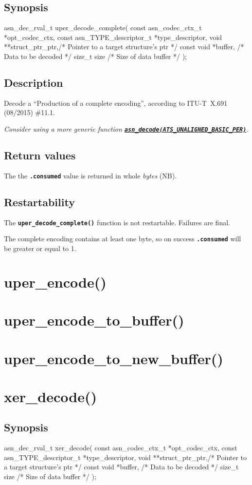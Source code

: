 \documentclass[english,oneside,12pt]{book}
\newcommand{\apisection}[2]{\clearpage\section{\label{#1}#2}}
\newcommand{\api}[2]{\hyperref[#1]{\code{#2}}}
\newcommand{\code}[1]{\texttt{\textbf{\lstinline{#1}}}}
\begin{document}
\subsection*{Synopsis}

\begin{signature}
asn_dec_rval_t uper_decode_complete(
    const asn_codec_ctx_t *opt_codec_ctx,
    const asn_TYPE_descriptor_t *type_descriptor,
    void **struct_ptr_ptr,/* Pointer to a target structure's ptr */
    const void *buffer,   /* Data to be decoded */
    size_t size           /* Size of data buffer */
);
\end{signature}

\subsection*{Description}

Decode a ``Production of a complete encoding'',
according to ITU-T~X.691 (08/2015) \#11.1.\newline

\noindent\emph{Consider using a more generic function \api{sec:asn_decode}{asn_decode(ATS_UNALIGNED_BASIC_PER)}.}

\subsection*{Return values}


The the \code{.consumed} value is returned in whole \emph{bytes} (NB).

\subsection*{Restartability}
The \code{uper_decode_complete()} function is not restartable.
Failures are final.

The complete encoding contains at least one byte, so on success
\code{.consumed} will be greater or equal to 1.

\apisection{sec:uper_encode}{uper\_encode()}
\apisection{sec:uper_encode_to_buffer}{uper\_encode\_to\_buffer()}
\apisection{sec:uper_encode_to_new_buffer}{uper\_encode\_to\_new\_buffer()}
\apisection{sec:xer_decode}{xer\_decode()}

\subsection*{Synopsis}

\begin{signature}
asn_dec_rval_t xer_decode(
    const asn_codec_ctx_t *opt_codec_ctx,
    const asn_TYPE_descriptor_t *type_descriptor,
    void **struct_ptr_ptr,/* Pointer to a target structure's ptr */
    const void *buffer,   /* Data to be decoded */
    size_t size           /* Size of data buffer */
);
\end{signature}
\end{document}
